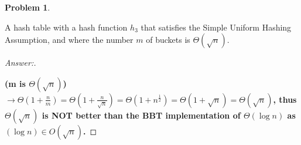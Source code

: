 \documentclass[11pt]{article}
\theoremstyle{definition}
\theoremstyle{definition}
\newtheorem{required}{Problem}
\theoremstyle{definition}
\begin{document}
\begin{required}
\begin{enumerate}[label=(\alph*)]
\vskip 15pt	
\item A hash table with a hash function $h_3$ that satisfies the Simple Uniform Hashing Assumption, and where the number $m$ of buckets is $\Theta(\sqrt{n})$.

\begin{proof}[Answer:] \
\item \textbf{(m is $\Theta(\sqrt{n})$) $\to \Theta(1 + \frac{n}{m}) = \Theta(1 + \frac{n}{\sqrt{n}}) = \Theta(1 + n^{\frac{1}{2}}) = \Theta(1 + \sqrt{n}) = \Theta(\sqrt{n})$, thus $\Theta(\sqrt{n})$ is NOT better than the BBT implementation of $\Theta(\log n)$ as $(\log n) \in O(\sqrt{n})$.}
\end{proof}

\end{enumerate}
\end{required}
\end{document}
